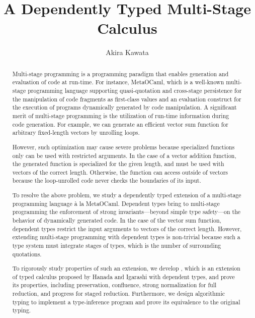 \documentclass{jfp1}
\begin{document}
\title{A Dependently Typed Multi-Stage Calculus}
\author{Akira Kawata}			%

\maketitle

\begin{abstract}


Multi-stage programming is a programming paradigm that enables generation and evaluation of code at run-time. For instance, MetaOCaml, which is
a well-known multi-stage programming language supporting quasi-quotation and
cross-stage persistence for the manipulation of code fragments as first-class
values and an evaluation construct for the execution of programs dynamically
generated by code manipulation. A significant merit of multi-stage
programming is the utilization of run-time information during code generation. For
example, we can generate an efficient vector sum function for arbitrary
fixed-length vectors by unrolling loops.


However, such optimization may cause severe problems because specialized
functions only can be used with restricted arguments. In the case of a vector
addition function, the generated function is specialized for the given
length, and must be used with vectors of the correct length. Otherwise, the
function can access outside of vectors because the loop-unrolled code never
checks the boundaries of its input.


To resolve the above problem, we study a dependently typed extension of a
multi-stage programming language \`a la MetaOCaml. Dependent types bring to
multi-stage programming the enforcement of strong invariants---beyond simple
type safety---on the behavior of dynamically generated code. In the case of
the vector sum function, dependent types restrict the input arguments to vectors of the correct length. However, extending multi-stage programming
with dependent types is non-trivial because such a type system must
integrate stages of types, which is the number of surrounding quotations.


To rigorously study properties of such an extension, we develop \LMD, which is
an extension of typed calculus \LTP proposed by Hanada and Igarashi with
dependent types, and prove its properties, including preservation,
confluence, strong normalization for full reduction, and progress for
staged reduction.  Furthermore, we design algorithmic typing to implement a
type-inference program and prove its equivalence to the original typing. 


\end{abstract}
\end{document}
